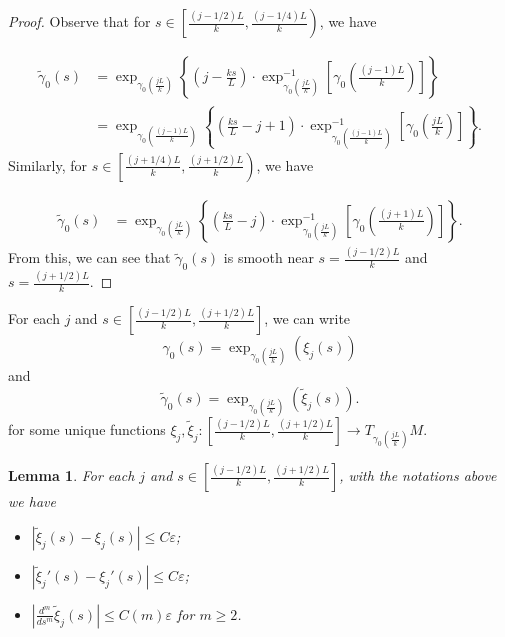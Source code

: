 \documentclass[a4paper, reqno]{amsart}
\newtheorem{lemma}[theorem]{Lemma}
\theoremstyle{definition}
\theoremstyle{remark}
\numberwithin{equation}{section}
\numberwithin{equation}{section}
\numberwithin{equation}{section}
\begin{document}
\begin{proof}
Observe that for $s\in \left[ \frac{(j - 1/2)L}{k}, \frac{(j - 1/4)L}{k}\right)$, we have

\begin{align*}
	\tilde{\gamma}_0(s) &= 	\exp_{\gamma_0\left(\frac{jL}{k}\right)}\left\{\left(j -\frac{ks}{L} \right)\cdot\exp_{\gamma_0\left(\frac{jL}{k}\right)}^{-1}\left[ \gamma_0\left(\frac{(j-1)L}{k}\right) \right]\right\}\\
	&= \exp_{\gamma_0\left(\frac{(j-1)L}{k}\right)}\left\{  \left(\frac{ks}{L} - j + 1 \right)\cdot \exp_{\gamma_0\left(\frac{(j-1)L}{k}\right)}^{-1}\left[ \gamma_0\left(\frac{jL}{k}\right) \right]\right\}.
\end{align*}
Similarly, for $s\in \left[ \frac{(j + 1/4)L}{k}, \frac{(j + 1/2)L}{k}\right)$, we have

\begin{align*}
	\tilde{\gamma}_0(s) &= \exp_{\gamma_0\left(\frac{jL}{k}\right)} \left\{  \left(\frac{ks}{L} - j \right)\cdot \exp_{\gamma_0\left(\frac{jL}{k}\right)}^{-1} \left[ \gamma_0\left(\frac{(j+1)L}{k}\right)  \right]\right\}.
\end{align*}
From this, we can see that $\tilde{\gamma}_0(s)$ is smooth near $s = \frac{(j - 1/2)L}{k}$ and $s = \frac{(j + 1/2)L}{k}$.

\end{proof}


\bigskip

For each $j$ and $s\in \left[\frac{(j - 1/2)L}{k}, \frac{(j + 1/2)L}{k}\right]$, we can write
\[ \gamma_0(s) = \exp_{\gamma_0\left(\frac{jL}{k}\right)}(\xi_j(s))\]
and
\[  \tilde{\gamma}_0(s) = \exp_{\gamma_0\left(\frac{jL}{k}\right)}(\tilde{\xi}_j(s)).\]
for some unique functions $\xi_j, \tilde{\xi}_j: \left[\frac{(j - 1/2)L}{k}, \frac{(j + 1/2)L}{k}\right] \to  T_{\gamma_0\left(\frac{jL}{k}\right)}M$.

\bigskip


\begin{lemma}{\label{closeness M}}
	For each $j$ and $s\in \left[\frac{(j - 1/2)L}{k}, \frac{(j + 1/2)L}{k}\right]$, with the notations above we have
\begin{itemize}
	\item[(i)]	$|\tilde{\xi}_j(s) - \xi_j(s)|\leq C\varepsilon$;
	\item[(ii)] $|\tilde{\xi}_j'(s) - \xi_j'(s)|\leq C\varepsilon$;
	\item[(iii)] $\left|\frac{d^m}{ds^m} \tilde{\xi}_j(s)\right|\leq C(m) \varepsilon$ for $m\geq 2$.
	\end{itemize}
\end{lemma}
\end{document}
